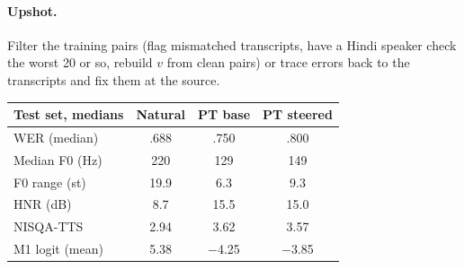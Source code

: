 \documentclass[11pt]{article}
\begin{document}
\paragraph{Upshot.} Filter the training pairs (flag mismatched transcripts, have a Hindi speaker check the worst 20 or so, rebuild $v$ from clean pairs) or trace errors back to the transcripts and fix them at the source.

\begin{center}
\begin{tabular}{lccc}
\toprule
Test set, medians & Natural & PT base & PT steered \\
\midrule
WER (median) & .688 & .750 & .800 \\
Median F0 (Hz) & 220 & 129 & 149 \\
F0 range (st) & 19.9 & 6.3 & 9.3 \\
HNR (dB) & 8.7 & 15.5 & 15.0 \\
NISQA-TTS & 2.94 & 3.62 & 3.57 \\
M1 logit (mean) & 5.38 & $-$4.25 & $-$3.85 \\
\bottomrule
\end{tabular}
\end{center}
\end{document}
